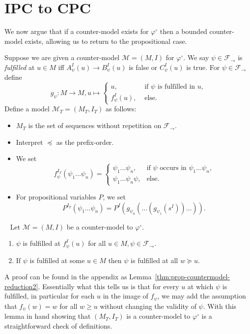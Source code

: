 \documentclass[a4paper,UKenglish,cleveref, autoref, thm-restate]{lipics-v2021}
\begin{document}
\section{IPC to CPC}

We now argue that if a counter-model exists for $\varphi^\circ$ then a bounded counter-model exists, allowing us to return to the propositional case.

\begin{definition}
Suppose we are given a counter-model $\mathcal M = (M, I)$ for $\varphi^\circ$.
We say $\psi\in\mathcal F_\to$ is \emph{fulfilled} at $u\in M$ iff $A_\psi^I(u)\to B_\psi^I(u)$ is false or $C_\psi^I(u)$ is true. For $\psi\in\mathcal F_\to$ define $$g_\psi : M\to M, u\mapsto\begin{cases}
		u,&\text{ if $\psi$ is fulfilled in $u$,}\\
		f^I_\psi(u),&\text{ else.}		
	\end{cases}$$Define a model $\mathcal M_T = (M_T, I_T)$ as follows:
	\begin{itemize}
		\item $M_T$ is the set of sequences without repetition on $\mathcal F_\to$.
		\item Interpret $\preceq$ as the prefix-order.
		\item We set $$f_\psi^{I_T}(\psi_1\dots\psi_n) = \begin{cases}
			\psi_1\dots\psi_n, &\text{if $\psi$ occurs in $\psi_1\dots\psi_n$,}\\
			\psi_1\dots\psi_n\psi, &\text{else.}			
		\end{cases}$$
		\item For propositional variables $P$, we set $$P^{I_T}(\psi_1\dots \psi_n) = P^I(g_{\psi_n}(\dots(g_{\psi_1}(s^I))\dots)).$$
	\end{itemize}
\end{definition}
\begin{lemma}~\label{thm:prop-countermodel-reduction}
	Let $\mathcal M = (M, I)$ be a counter-model to $\mathcal \varphi^\circ$.
	\begin{enumerate}
		\item $\psi$ is fulfilled at $f_\psi^I(u)$ for all $u\in M, \psi\in\mathcal F_\to$.
		\item If $\psi$ is fulfilled at some $u\in M$ then $\psi$ is fulfilled at all $w\succeq u$.
	\end{enumerate}
\end{lemma}

A proof can be found in the appendix as Lemma~\ref{thm:prop-countermodel-reduction2}. Essentially what this tells us is that for every $u$ at which $\psi$ is fulfilled, in particular for each $u$ in the image of $f_\psi$, we may add the assumption that $f_\psi(w) = w$ for all $w\geq u$ without changing the validity of $\psi$.
With this lemma in hand showing that $(M_T, I_T)$ is a counter-model to $\varphi^\circ$ is a straightforward check of definitions.
\end{document}
